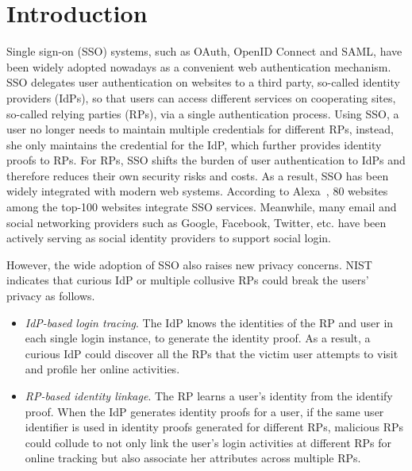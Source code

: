 \section{Introduction}
\label{sec:intro}

Single sign-on (SSO) systems, such as OAuth, OpenID Connect and SAML, have been widely adopted nowadays as a convenient web authentication mechanism. SSO delegates user authentication on websites to a third party, so-called identity providers (IdPs), so that users can access different services on cooperating sites, so-called relying parties (RPs), via a single authentication process. Using SSO, a user no longer needs to maintain multiple credentials for different RPs, instead, she only maintains the credential for the IdP, which further provides identity proofs to RPs.
For RPs, SSO shifts the burden of user authentication to IdPs and therefore reduces their own security risks and costs. As a result, SSO has been widely integrated with modern web systems.
According to Alexa~\cite{Alexa}, 80 websites among the top-100 websites integrate SSO services. Meanwhile, many email and social networking providers such as Google, Facebook, Twitter, etc. have been actively serving as social identity providers to support social login.

However, the wide adoption of SSO also raises new privacy concerns. 
NIST~\cite{NIST2017draft} indicates that 
curious IdP or multiple collusive RPs could break the users' privacy as follows.
\begin{itemize}
\item {\em IdP-based login tracing}. The IdP knows the identities of the RP and user in each single login instance, to generate the identity proof.
As a result, a curious IdP could discover all the RPs that the victim user attempts to visit and profile her online activities.
\item {\em RP-based identity linkage}. The RP learns a user's identity from the identify proof.
When the IdP generates identity proofs for a user, if the same user identifier is used in identity proofs generated for different RPs, malicious RPs could collude to not only link the user's login activities at different RPs for online tracking but also associate her attributes across multiple RPs.
\end{itemize}

